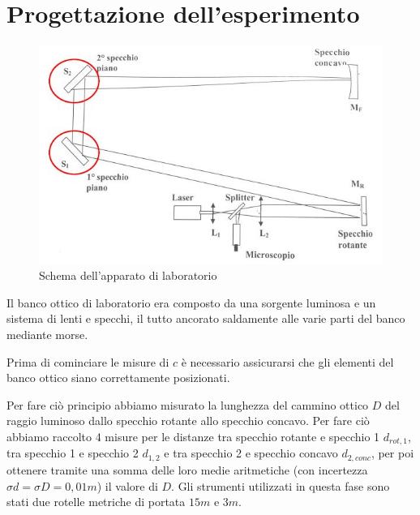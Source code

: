 \documentclass{article}
\begin{document}
\section{Progettazione dell'esperimento}

\begin{figure}[h] %
    \centering
    \includegraphics[width=0.6\linewidth]{Progettazione1.JPG}
    \caption{Schema dell'apparato di laboratorio}
    \label{schema_apparato}
\end{figure}

Il banco ottico di laboratorio era composto da una sorgente luminosa e un sistema di lenti e specchi, il tutto ancorato saldamente alle varie parti del banco mediante 
morse.

Prima di cominciare le misure di $c$ è necessario assicurarsi che gli elementi del banco ottico siano correttamente posizionati.

\vspace{3mm}

Per fare ciò principio abbiamo misurato la lunghezza del cammino ottico $D$ del raggio luminoso dallo specchio rotante allo specchio concavo. Per fare ciò abbiamo raccolto 
4 misure per le distanze tra specchio rotante e specchio 1 $d_{rot,1}$, tra specchio 1 e specchio 2 $d_{1,2}$ e tra specchio 2 e specchio concavo $d_{2,conc}$, per poi 
ottenere tramite una somma delle loro medie aritmetiche (con incertezza $\sigma d = \sigma D = 0,01 m$) il valore di $D$. Gli strumenti utilizzati in questa fase sono
stati due rotelle metriche di portata $15m$ e $3m$.
\end{document}
